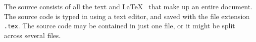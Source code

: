   The \gls*{source} consists of all the text and \LaTeX\
   that make up an entire document.
  The source code is typed in using a text
  editor, and saved with
  the file extension \texttt{.tex}.  The source code may be contained
  in just one file, or it might be split across several files.%
